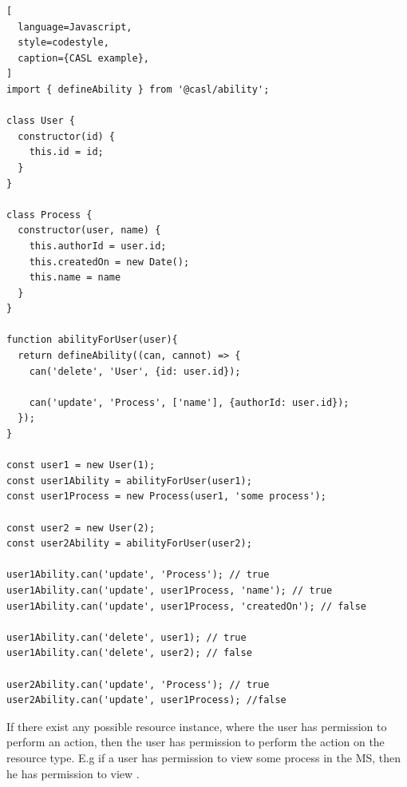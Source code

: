 \begin{lstlisting}[
  language=Javascript,
  style=codestyle,
  caption={CASL example},
]
import { defineAbility } from '@casl/ability';

class User {
  constructor(id) {
    this.id = id;
  }
}

class Process {
  constructor(user, name) {
    this.authorId = user.id;
    this.createdOn = new Date();
    this.name = name
  }
}

function abilityForUser(user){
  return defineAbility((can, cannot) => {
    can('delete', 'User', {id: user.id});

    can('update', 'Process', ['name'], {authorId: user.id});
  });
}

const user1 = new User(1);
const user1Ability = abilityForUser(user1);
const user1Process = new Process(user1, 'some process');

const user2 = new User(2);
const user2Ability = abilityForUser(user2);

user1Ability.can('update', 'Process'); // true
user1Ability.can('update', user1Process, 'name'); // true
user1Ability.can('update', user1Process, 'createdOn'); // false

user1Ability.can('delete', user1); // true
user1Ability.can('delete', user2); // false

user2Ability.can('update', 'Process'); // true
user2Ability.can('update', user1Process); //false
\end{lstlisting}

If there exist any possible resource instance, where the user has permission to perform an action,
then the user has permission to perform the action on the resource type.
E.g if a user has permission to view some process in the MS, then he has permission to view .

